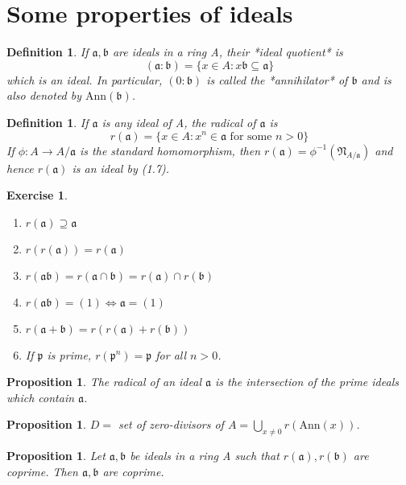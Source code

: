\documentclass[]{report}
\newtheorem{prop}[theorem]{Proposition}
\newtheorem{defn}[theorem]{Definition}
\newtheorem{exercise}[theorem]{Exercise}
\begin{document}
\section{Some properties of ideals}

\begin{defn}
    If $\mathfrak{a, b}$ are ideals in a ring A, their *ideal quotient* is 
$$\mathfrak{(a:b)} = \{x\in A: x\mathfrak{b\subseteq a}\}$$
which is an ideal. 
In particular, $(0:\mathfrak{b})$ is called the *annihilator* of $\mathfrak{b}$ and is also denoted by $\text{Ann}(\mathfrak{b})$.
\end{defn}

\begin{defn}
    If $\mathfrak{a}$ is any ideal of A, the radical of $\mathfrak{a}$ is
$$r(\mathfrak{a}) = \{x\in A: x^n\in \mathfrak{a} \text{ for some } n>0\}$$
If $\phi: A\rightarrow A/\mathfrak{a}$ is the standard homomorphism, then $r(\mathfrak{a}) = \phi^{-1}(\mathfrak{N}_{A/\mathfrak{a}})$ and hence $r(\mathfrak{a})$ is an ideal by (1.7).
\end{defn}

\begin{exercise}
    \begin{enumerate}
        \item $r(\mathfrak{a}) \supseteq \mathfrak{a}$
        \item $r(r(\mathfrak{a})) = r(\mathfrak{a})$
        \item $r(\mathfrak{ab}) = r(\mathfrak{a\cap b}) = r(\mathfrak{a}) \cap r(\mathfrak{b})$
        \item $r(\mathfrak{ab}) = (1) \Leftrightarrow \mathfrak{a} = (1)$
        \item $r(\mathfrak{a+b}) = r(r(\mathfrak{a}) + r(\mathfrak{b}))$
        \item If $\mathfrak{p}$ is prime, $r(\mathfrak{p}^n) = \mathfrak{p}$ for all $n>0$.
    \end{enumerate}
\end{exercise}

\begin{prop}
    The radical of an ideal $\mathfrak{a}$ is the intersection of the prime ideals which contain $\mathfrak{a}$.
\end{prop}

\begin{prop}
    $D =$ set of zero-divisors of $A = \bigcup_{x\neq 0} r(\text{Ann}(x))$.
\end{prop}

\begin{prop}
    Let $\mathfrak{a,b}$ be ideals in a ring A such that $r(\mathfrak{a}), r(\mathfrak{b})$ are coprime. Then $\mathfrak{a,b}$ are coprime.
\end{prop}
\end{document}
